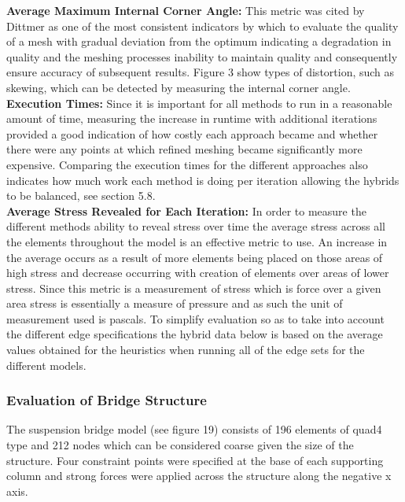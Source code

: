 \noindent
\textbf{Average Maximum Internal Corner Angle: } This metric was cited by Dittmer \cite{DittmerMeshQualityMet}as one of the most consistent indicators by which to evaluate the quality of a mesh with gradual deviation from the optimum indicating a degradation in quality and the meshing processes inability to maintain quality and consequently ensure accuracy of subsequent results. Figure 3 show types of distortion, such as skewing, which can be detected by measuring the internal corner angle. \\ 

\noindent
\textbf{Execution Times: } Since it is important for all methods to run in a reasonable amount of time, measuring the increase in runtime with additional iterations provided a good indication of how costly each approach became and whether there were any points at which refined meshing became significantly more expensive. Comparing the execution times for the different approaches also indicates how much work each method is doing per iteration allowing the hybrids to be balanced, see section 5.8. \\


\noindent
\textbf{Average Stress Revealed for Each Iteration: } In order to measure the different methods ability to reveal stress over time the average stress across all the elements throughout the model is an effective metric to use. An increase in the average occurs as a result of more elements being placed on those areas of high stress and decrease occurring with creation of elements over areas of lower stress. Since this metric is a measurement of stress which is force over a given area stress is essentially a measure of pressure and as such the unit of measurement used is pascals. To simplify evaluation so as to take into account the different edge specifications the hybrid data below is based on the average values obtained for the heuristics when running all of the edge sets for the different models. \\ 


\subsubsection{Evaluation of Bridge Structure}
The suspension bridge model (see figure 19) consists of 196 elements of quad4 type and 212 nodes which can be considered coarse given the size of the structure. Four constraint points were specified at the base of each supporting column and strong forces were applied across the structure along the negative x axis. \\

